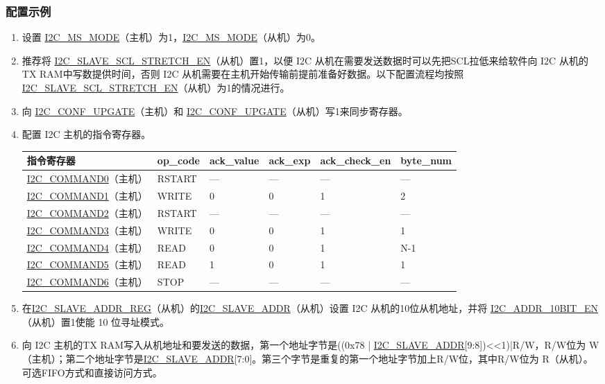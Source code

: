 \documentclass[main\_\_CN.tex]{subfiles}
\begin{document}
\subsubsection{配置示例}
\begin{enumerate}
\item 设置 \hyperref[fielddesc:I2CMSMODE]{I2C\_MS\_MODE}（主机）为1，\hyperref[fielddesc:I2CMSMODE]{I2C\_MS\_MODE}（从机）为0。
\item 推荐将 \hyperref[fielddesc:I2CSLAVESCLSTRETCHEN]{I2C\_SLAVE\_SCL\_STRETCH\_EN}（从机）置1，以便 I2C 从机在需要发送数据时可以先把SCL拉低来给软件向 I2C 从机的TX RAM中写数提供时间，否则 I2C 从机需要在主机开始传输前提前准备好数据。以下配置流程均按照\hyperref[fielddesc:I2CSLAVESCLSTRETCHEN]{I2C\_SLAVE\_SCL\_STRETCH\_EN}（从机）为1的情况进行。 
\item 向 \hyperref[fielddesc:I2CCONFUPGATE]{I2C\_CONF\_UPGATE}（主机）和 \hyperref[fielddesc:I2CCONFUPGATE]{I2C\_CONF\_UPGATE}（从机）写1来同步寄存器。
\item 配置 I2C 主机的指令寄存器。
\begin{longtable}{ | p{4cm} | p{2cm} | p{2cm} | p{2cm} |p{2cm} | p{2cm} |}
\hline\rowcolor{lightgray}
指令寄存器& op\_code & ack\_value&ack\_exp&ack\_check\_en&byte\_num  \\ \hline
\hyperref[fielddesc:I2CCOMMAND0]{I2C\_COMMAND0}（主机）& RSTART& ---&---&---&---  \\ \hline
\hyperref[fielddesc:I2CCOMMAND1]{I2C\_COMMAND1}（主机）& WRITE& 0&0&1&2  \\ \hline
\hyperref[fielddesc:I2CCOMMAND2]{I2C\_COMMAND2}（主机）& RSTART& ---&---&---&---  \\ \hline
\hyperref[fielddesc:I2CCOMMAND3]{I2C\_COMMAND3}（主机）& WRITE& 0&0&1&1  \\ \hline
\hyperref[fielddesc:I2CCOMMAND4]{I2C\_COMMAND4}（主机）& READ& 0&0&1&N-1  \\ \hline
\hyperref[fielddesc:I2CCOMMAND5]{I2C\_COMMAND5}（主机）& READ& 1&0&1&1  \\ \hline
\hyperref[fielddesc:I2CCOMMAND6]{I2C\_COMMAND6}（主机）& STOP& ---&---&---&---  \\ \hline
\end{longtable}

\item 在\hyperref[regdesc:I2CSLAVEADDRREG]{I2C\_SLAVE\_ADDR\_REG}（从机）的\hyperref[fielddesc:I2CSLAVEADDR]{I2C\_SLAVE\_ADDR}（从机）设置 I2C 从机的10位从机地址，并将 \hyperref[fielddesc:I2CADDR10BITEN]{I2C\_ADDR\_10BIT\_EN}（从机）置1使能 10 位寻址模式。
\item 向 I2C 主机的TX RAM写入从机地址和要发送的数据，第一个地址字节是((0x78 | \hyperref[fielddesc:I2CSLAVEADDR]{I2C\_SLAVE\_ADDR}[9:8])<<1)|R/W，R/W位为 W（主机）；第二个地址字节是\hyperref[fielddesc:I2CSLAVEADDR]{I2C\_SLAVE\_ADDR}[7:0]。第三个字节是重复的第一个地址字节加上R/W位，其中R/W位为 R（从机）。可选FIFO方式和直接访问方式。


\end{enumerate}
\end{document}
